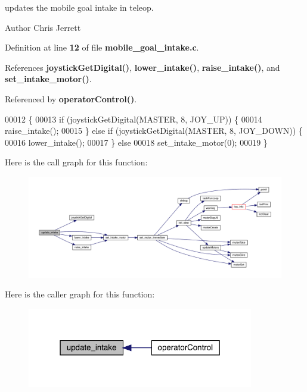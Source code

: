 updates the mobile goal intake in teleop. 

\begin{DoxyAuthor}{Author}
Chris Jerrett 
\end{DoxyAuthor}


Definition at line \textbf{ 12} of file \textbf{ mobile\+\_\+goal\+\_\+intake.\+c}.



References \textbf{ joystick\+Get\+Digital()}, \textbf{ lower\+\_\+intake()}, \textbf{ raise\+\_\+intake()}, and \textbf{ set\+\_\+intake\+\_\+motor()}.



Referenced by \textbf{ operator\+Control()}.


\begin{DoxyCode}
00012                      \{
00013   \textcolor{keywordflow}{if} (joystickGetDigital(MASTER, 8, JOY\_UP)) \{
00014     raise_intake();
00015   \} \textcolor{keywordflow}{else} \textcolor{keywordflow}{if} (joystickGetDigital(MASTER, 8, JOY\_DOWN)) \{
00016     lower_intake();
00017   \} \textcolor{keywordflow}{else}
00018     set_intake_motor(0);
00019 \}
\end{DoxyCode}
Here is the call graph for this function\+:
\nopagebreak
\begin{figure}[H]
\begin{center}
\leavevmode
\includegraphics[width=350pt]{mobile__goal__intake_8c_a5d7bad8a208988af743fd2e68f111286_cgraph}
\end{center}
\end{figure}
Here is the caller graph for this function\+:
\nopagebreak
\begin{figure}[H]
\begin{center}
\leavevmode
\includegraphics[width=280pt]{mobile__goal__intake_8c_a5d7bad8a208988af743fd2e68f111286_icgraph}
\end{center}
\end{figure}
